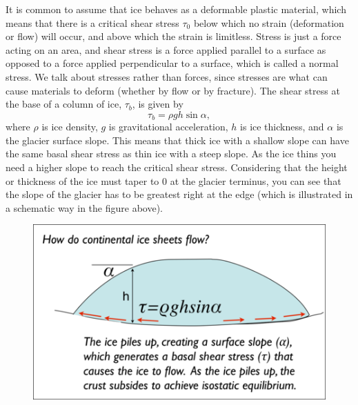 \documentclass[11pt,letterpaper]{article}
\begin{document}
It is common to assume that ice behaves as a deformable plastic material, which means that there is a critical shear stress $\tau_0$ below which no strain (deformation or flow) will occur, and above which the strain is limitless. Stress is just a force acting on an area, and shear stress is a force applied parallel to a surface as opposed to a force applied perpendicular to a surface, which is called a normal stress. We talk about stresses rather than forces, since stresses are what can cause materials to deform (whether by flow or by fracture). The shear stress at the base of a column of ice, $\tau_b$, is given by\\
\begin{equation}
\tau_b = \rho g h \sin\alpha,
\end{equation}
where $\rho$ is ice density, $g$ is gravitational acceleration, $h$ is ice thickness, and $\alpha$ is the glacier surface slope. This means that thick ice with a shallow slope can have the same basal shear stress as thin ice with a steep slope. As the ice thins you need a higher slope to reach the critical shear stress. Considering that the height or thickness of the ice must taper to 0 at the glacier terminus, you can see that the slope of the glacier has to be greatest right at the edge (which is illustrated in a schematic way in the figure above).

\begin{figure}[]
\begin{center}
\includegraphics[]{./ice_sheet_flow_v2.png}
\end{center}
\end{figure}
\end{document}
